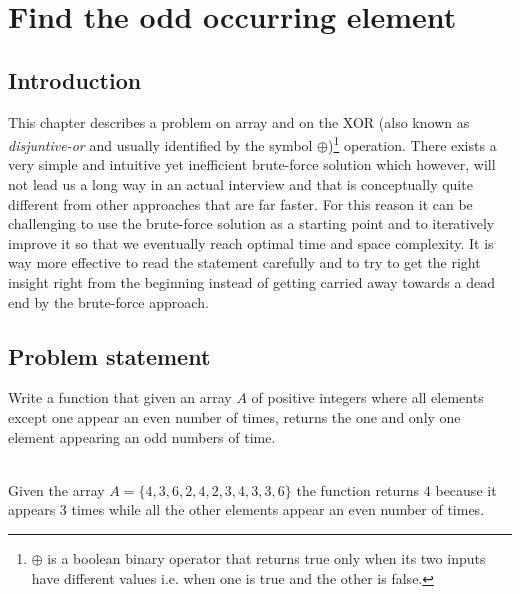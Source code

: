 %

\chapter{Find the odd occurring element}
\label{ch:find_odd_occurring_element}
\section*{Introduction}

This chapter describes a problem on array and on the XOR (also known as \textit{disjuntive-or} and usually identified by the symbol $\oplus$)\footnote{
	$\oplus$ is a boolean binary operator that returns true only when its two inputs have different values i.e. when one is true and the other is false.} 
operation.
There exists a very simple and intuitive yet inefficient brute-force solution which however, will not lead us a long way in an actual interview and that is conceptually quite different from other approaches that are far faster. For this reason it can be challenging to use the brute-force solution as a starting point and to iteratively improve it so that we eventually reach optimal time and space complexity. It is way more effective to read the statement carefully and to try to get the right insight right from the beginning instead of getting carried away towards a dead end by the brute-force approach.

\section{Problem statement}
\begin{exercise}
Write a function that given an array $A$ of positive integers where all elements except one appear an even number of times, returns the one and only one element appearing an odd numbers of time.

	\begin{example}
		\label{ex:find_odd_occurring_element:example1}
		\hfill \\
		Given the array $A=\{4,3,6,2,4,2,3,4,3,3,6\}$ the function returns $4$ because it appears $3$ times while all the other elements appear an even number of times.
		
	\end{example}
\end{exercise}


